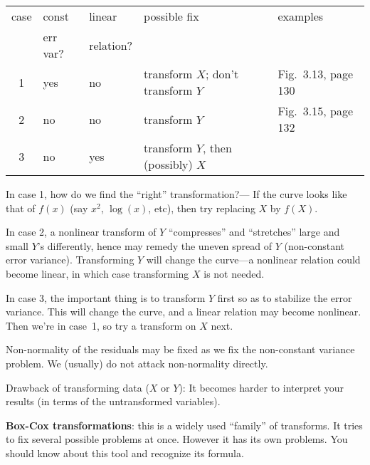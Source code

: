 \documentclass[12pt]{article}
\begin{document}
\begin{center}
\begin{tabular}{cllll}
case & const & linear & possible fix & examples
\\
& err var? & relation? & &
\\ \hline
1 & yes  & no & transform $X$; don't transform $Y$ & Fig.~3.13, page 130
\\
2 & no & no & transform $Y$ & Fig.~3.15, page 132
\\
3 & no & yes & transform $Y$, then (possibly) $X$ &
\\ \hline
\end{tabular}
\end{center}

In case 1, how do we find the ``right'' transformation?---%
If the curve looks like that of $f(x)$ (say $x^2$, $\log(x)$, etc),
then try replacing $X$ by $f(X)$.

In case 2, a nonlinear transform of $Y$ ``compresses'' and ``stretches''
large and small $Y$'s differently, hence may remedy the uneven spread of
$Y$ (\ie non-constant error variance).
Transforming $Y$ will change the curve---a nonlinear relation could
become linear, in which case transforming $X$ is not needed.

In case 3, the important thing is to transform $Y$ first so as to
stabilize the error variance.
This will change the curve, and a linear relation may become nonlinear.
Then we're in case~1, so try a transform on $X$ next.

\bigskip
Non-normality of the residuals may be fixed as we fix the non-constant
variance problem. We (usually) do not attack non-normality directly.

\bigskip
Drawback of transforming data ($X$ or $Y$): It becomes harder to interpret
your results (in terms of the untransformed variables).

\bigskip
\textbf{Box-Cox transformations}:
this is a widely used ``family'' of transforms.
It tries to fix several possible problems at once.
However it has its own problems.
You should know about this tool and recognize its formula.
\end{document}
